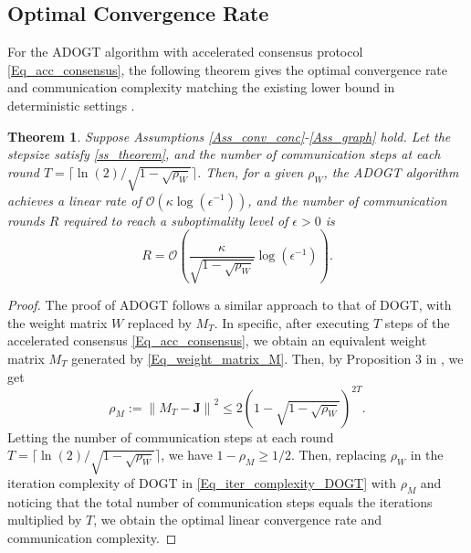 \documentclass[letterpaper, 10 pt, conference]{ieeeconf}
\newtheorem{Thm}{Theorem}
\begin{document}
\subsection{Optimal Convergence Rate}
For the ADOGT algorithm with accelerated consensus protocol \eqref{Eq_acc_consensus}, the following theorem gives the optimal convergence rate and communication complexity matching the existing lower bound in deterministic settings \cite{beznosikov2020distributed}.


\begin{Thm}\label{Thm_acc_DOGT}
Suppose Assumptions \ref{Ass_conv_conc}-\ref{Ass_graph} hold. Let the stepsize satisfy \eqref{ss_theorem}, and the number of communication steps at each round $T=\lceil \ln \left( 2 \right) /\sqrt{1-\sqrt{\rho _W}} \rceil $. Then, for a given $\rho_W$, the ADOGT algorithm achieves a linear rate of $\mathcal{O} \left( \kappa \log \left( \epsilon ^{-1} \right) \right) $, and the number of communication rounds $R$ required to reach a suboptimality level of $\epsilon >0$ is 
\begin{equation}
R=\mathcal{O} \left( \frac{\kappa}{\sqrt{1-\sqrt{\rho _W}}}\log \left( \epsilon ^{-1} \right) \right).
\end{equation}
\end{Thm}

\begin{proof}
The proof of ADOGT follows a similar approach to that of DOGT, with the weight matrix $W$ replaced by $M_T$. In specific, after executing $T$ steps of the accelerated consensus \eqref{Eq_acc_consensus}, we obtain an equivalent weight matrix $M_T$ generated by \eqref{Eq_weight_matrix_M}.
Then, by Proposition 3 in \cite{liu2011accelerated}, we get
\begin{equation}
\rho _M:=\left\| M_T-\mathbf{J} \right\| ^2\leqslant 2\left( 1-\sqrt{1-\sqrt{\rho _W}} \right) ^{2T}.
\end{equation}
Letting the number of communication steps at each round $T=\lceil \ln(2)/\sqrt{1-\sqrt{\rho _W}} \rceil $, we have $1-\rho _M \geqslant 1/2$. 
Then, replacing $\rho_W$ in the iteration complexity of DOGT in \eqref{Eq_iter_complexity_DOGT} with $\rho_M$ and noticing that the total number of communication steps equals the iterations multiplied by $T$, we obtain the optimal linear convergence rate and communication complexity.
\end{proof}
\end{document}
